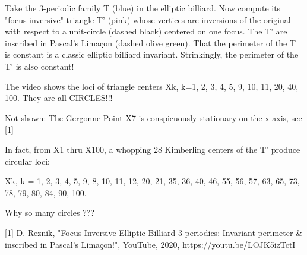 Take the 3-periodic family T (blue) in the elliptic billiard. Now compute its "focus-inversive" triangle T' (pink) whose vertices are inversions of the original with respect to a unit-circle (dashed black) centered on one focus. The T' are inscribed in Pascal's Limaçon (dashed olive green). That the perimeter of the T is constant is a classic elliptic billiard invariant. Strinkingly, the perimeter of the T' is also constant!

The video shows the loci of triangle centers Xk, k=1, 2, 3, 4, 5, 9, 10, 11, 20, 40, 100. They are all CIRCLES!!!

Not shown: The Gergonne Point X7 is conspicuously stationary on the x-axis, see [1]

In fact, from X1 thru X100, a whopping 28 Kimberling centers of the T' produce circular loci:

Xk, k = 1, 2, 3, 4, 5, 9, 8, 10, 11, 12, 20, 21, 35, 36, 40, 46, 55, 56, 57, 63, 65, 73, 78, 79, 80, 84, 90, 100.

Why so many circles ???

[1] D. Reznik, "Focus-Inversive Elliptic Billiard 3-periodics: Invariant-perimeter & inscribed in Pascal's Limaçon!", YouTube, 2020, https://youtu.be/LOJK5izTctI
